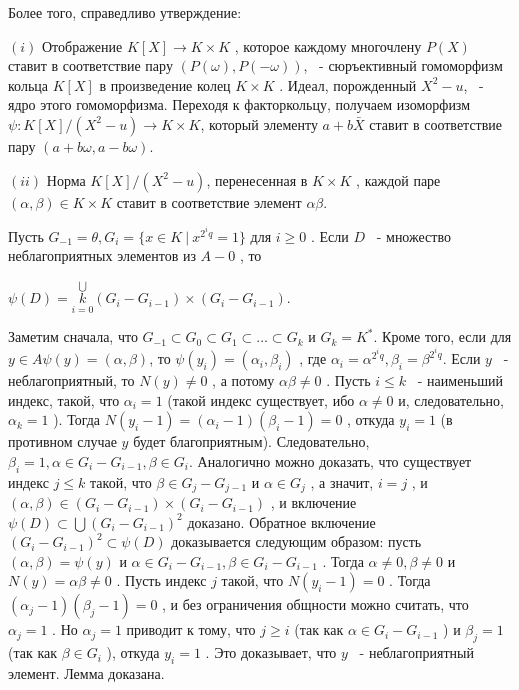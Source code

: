 \documentclass{mai_book}
\begin{document}
Более того, справедливо утверждение:

\begin{lemma}

$(i)$
 Отображение $K[X]\rightarrow K\times K$
 , которое каждому многочлену $P(X)$
 ставит в соответствие пару $(P(\omega),P(-\omega))$,
 ~- сюръективный гомоморфизм кольца $K[X]$
 в произведение колец $K\times K$
 . Идеал, порожденный $X^2 - u$, ~- ядро этого гомоморфизма. Переходя к факторкольцу, получаем изоморфизм $\psi : K[X]/(X^2 -u)\rightarrow K\times K$, который элементу $a+b\bar X$
 ставит в соответствие пару $(a+b\omega, a - b\omega)$.

$(ii)$ Норма $K[X]/(X^2 - u)$, перенесенная в $K\times K$
, каждой паре $(\alpha,\beta) \in K\times K$
 ставит в соответствие элемент $\alpha\beta$.
\end{lemma}
\newpage

\begin{lemma}

Пусть $G_{-1}=\theta, G_i = \{x \in K \ | \ x^{2^iq} = 1\}$
 для $i\geqslant 0$
 . Если $D$
 ~- множество неблагоприятных элементов из $A - {0}$
 , то 
\end{lemma}
\begin{center}
$\psi(D) = \underset{i=0}{\overset{\bigcup}{k}}(G_i - G_{i-1})\times (G_i - G_{i-1})$.
\end{center}



\begin{myproof}
Заметим сначала, что $G_{-1}\subset G_0 \subset G_1 \subset \dots\subset G_k$ и $G_k = K^*$. Кроме того, если для $y \in A \psi(y) = (\alpha,\beta)$, то $\psi(y_i)=(\alpha_i,\beta_i)$
, где $\alpha_i = \alpha^{2^iq}, \beta_i = \beta^{2^iq}$.
Если $y$
 ~- неблагоприятный, то $N(y)\not= 0$
 , а потому $\alpha\beta\not= 0$
. Пусть $i\leqslant k$
 ~- наименьший индекс, такой, что $\alpha_i = 1$
 (такой индекс существует, ибо $\alpha\not= 0$
 и, следовательно, $\alpha_k = 1$
 ). Тогда $N(y_i-1) = (\alpha_i-1)(\beta_i - 1)=0$
 , откуда $y_i = 1$
 (в противном случае $y$
 будет благоприятным). Следовательно, $\beta_i = 1, \alpha \in G_i - G_{i-1}, \beta\in G_i$. Аналогично можно доказать, что существует индекс $j\leqslant k$
 такой, что $\beta\in G_j-G_{j-1}$
 и $\alpha\in G_j$
 , а значит, $i=j$
, и $(\alpha,\beta)\in (G_i-G_{i-1})\times(G_i-G_{i-1})$
, и включение $\psi(D)\subset\bigcup(G_i-G_{i-1})^2$
 доказано.
Обратное включение $(G_i-G_{i-1})^2\subset\psi(D)$
 доказывается следующим образом: пусть $(\alpha,\beta)=\psi(y)$
 и $\alpha\in G_i-G_{i-1}, \beta\in G_i-G_{i-1}$
 . Тогда $\alpha\not= 0, \beta\not= 0$
 и $N(y) = \alpha\beta\not= 0$
 . Пусть индекс $j$
 такой, что $N(y_i-1)=0$
 . Тогда $(\alpha_j-1)(\beta_j-1)=0$
, и без ограничения общности можно считать, что $\alpha_j = 1$
. Но $\alpha_j =1$
 приводит к тому, что $j\geqslant i$
 (так как $\alpha\in G_i - G_{i-1}$
    ) и $\beta_j = 1$
 (так как $\beta\in G_i$
    ), откуда $y_i = 1$
. Это доказывает, что $y$
 ~- неблагоприятный элемент. Лемма доказана.
\end{myproof}
\end{document}
